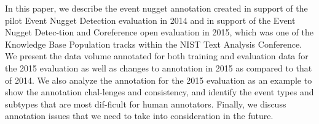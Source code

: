 In this paper, we describe the event nugget annotation created in support of the pilot Event Nugget Detection evaluation in 2014 and in support of the Event Nugget Detec-tion and Coreference open evaluation in 2015, which was one of the Knowledge Base Population tracks within the NIST Text Analysis Conference. We present the data volume annotated for both training and evaluation data for the 2015 evaluation as well as changes to annotation in 2015 as compared to that of 2014. We also analyze the annotation for the 2015 evaluation as an example to show the annotation chal-lenges and consistency, and identify the event types and subtypes that are most dif-ficult for human annotators. Finally, we discuss annotation issues that we need to take into consideration in the future.
